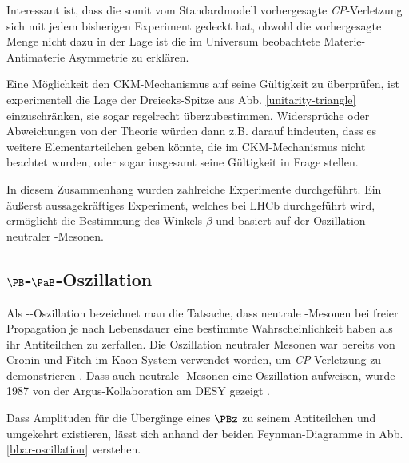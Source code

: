 Interessant ist, dass die somit vom Standardmodell vorhergesagte \textit{CP}-Verletzung sich mit jedem bisherigen Experiment gedeckt hat, obwohl die vorhergesagte Menge nicht dazu in der Lage ist die im Universum beobachtete Materie-Antimaterie Asymmetrie zu erklären.

Eine Möglichkeit den CKM-Mechanismus auf seine Gültigkeit zu überprüfen, ist experimentell die Lage der Dreiecks-Spitze aus Abb. \ref{unitarity-triangle} einzuschränken, sie sogar regelrecht überzubestimmen.
Widersprüche oder Abweichungen von der Theorie würden dann z.B. darauf hindeuten, dass es weitere Elementarteilchen geben könnte, die im CKM-Mechanismus nicht beachtet wurden, oder sogar insgesamt seine Gültigkeit in Frage stellen.

In diesem Zusammenhang wurden zahlreiche Experimente durchgeführt.
Ein äußerst aussagekräftiges Experiment, welches bei LHCb durchgeführt wird, ermöglicht die Bestimmung des Winkels $β$ und basiert auf der Oszillation neutraler \PB-Mesonen.

\subsection{$\PB$-$\PaB$-Oszillation}

Als \PB-\PaB-Oszillation bezeichnet man die Tatsache, dass neutrale \PB-Mesonen bei freier Propagation je nach Lebensdauer eine bestimmte Wahrscheinlichkeit haben als ihr Antiteilchen zu zerfallen.
Die Oszillation neutraler Mesonen war bereits von Cronin und Fitch im Kaon-System verwendet worden, um \textit{CP}-Verletzung zu demonstrieren \cite{kaons-cronin-fitch}.
Dass auch neutrale \PB-Mesonen eine Oszillation aufweisen, wurde 1987 von der Argus-Kollaboration am DESY gezeigt \cite{argus-bbar}.

Dass Amplituden für die Übergänge eines $\PBz$ zu seinem Antiteilchen und umgekehrt existieren, lässt sich anhand der beiden Feynman-Diagramme in Abb. \ref{bbar-oscillation} verstehen.

